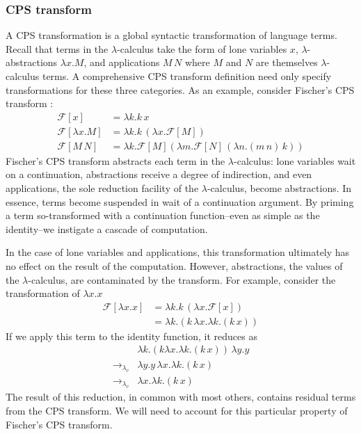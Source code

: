 \documentclass[ms,electronic,twosidetoc,letterpaper,chaptercenter,parttop]{byumsphd}
\begin{document}
\subsubsection{CPS transform}

A CPS transformation is a global syntactic transformation of language terms. Recall that
terms in the $\lambda$-calculus take the form of lone variables $x$,
$\lambda$-abstractions $\lambda x.M$, and applications $M\,N$ where $M$ and $N$ are
themselves $\lambda$-calculus terms. A comprehensive CPS transform definition need only
specify transformations for these three categories. As an example, consider Fischer's CPS
transform \cite{fischer1972lambda}:
\begin{align*}
\mathcal{F}[x]           &= \lambda k.k\,x\\
\mathcal{F}[\lambda x.M] &= \lambda k.k\,(\lambda x.\mathcal{F}[M])\\
\mathcal{F}[M\,N]        &= \lambda k.\mathcal{F}[M](\lambda m.\mathcal{F}[N]\,(\lambda n.(m\,n)\,k))
\end{align*}
Fischer's CPS transform abstracts each term in the $\lambda$-calculus: lone variables
wait on a continuation, abstractions receive a degree of indirection, and even
applications, the sole reduction facility of the $\lambda$-calculus, become abstractions.
In essence, terms become suspended in wait of a continuation argument. By priming a term
so-transformed with a continuation function--even as simple as the identity--we instigate
a cascade of computation.

In the case of lone variables and applications, this transformation ultimately has no
effect on the result of the computation. However, abstractions, the values of the
$\lambda$-calculus, are contaminated by the transform. For example, consider the
transformation of $\lambda x.x$
\begin{align*}
\mathcal{F}[\lambda x.x] &= \lambda k.k\,(\lambda x.\mathcal{F}[x])\\
                         &= \lambda k.(k\,\lambda x.\lambda k.(k\,x))
\end{align*}
If we apply this term to the identity function, it reduces as
\begin{align*}
                        &\lambda k.(k \lambda x.\lambda k.(k\,x))\,\lambda y.y\\
\rightarrow_{\lambda_v} &\lambda y.y\,\lambda x.\lambda k.(k\,x)\\
\rightarrow_{\lambda_v} &\lambda x.\lambda k.(k\,x)
\end{align*}
The result of this reduction, in common with most others, contains residual terms from the
CPS transform. We will need to account for this particular property of Fischer's CPS
transform.
\end{document}
